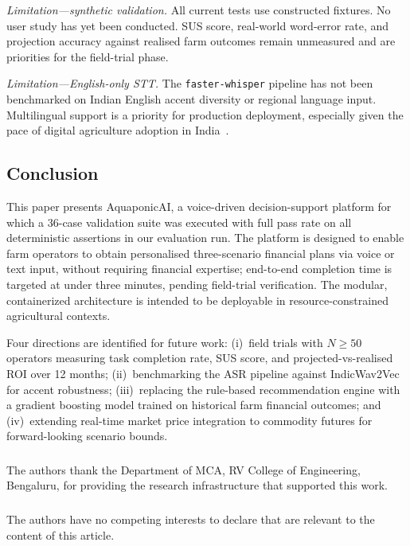 \documentclass[runningheads]{llncs}
\begin{document}
\noindent\textit{Limitation---synthetic validation.}
All current tests use constructed fixtures. No user study has yet been
conducted. SUS score, real-world word-error rate, and projection
accuracy against realised farm outcomes remain unmeasured and are
priorities for the field-trial phase.

\medskip
\noindent\textit{Limitation---English-only STT.}
The \texttt{faster-whisper} pipeline has not been benchmarked on
Indian English accent diversity or regional language input.
Multilingual support is a priority for production deployment,
especially given the pace of digital agriculture adoption in
India~\cite{ref18}.

\subsection{Conclusion}

This paper presents AquaponicAI, a voice-driven decision-support
platform for which a 36-case validation suite was executed with
full pass rate on all deterministic assertions in our evaluation run.
The platform is designed to enable farm operators to obtain
personalised three-scenario financial plans via voice or text input,
without requiring financial expertise; end-to-end completion time
is targeted at under three minutes, pending field-trial verification.
The modular, containerized architecture is intended to be deployable
in resource-constrained agricultural contexts.

Four directions are identified for future work:
(i)~field trials with $N{\geq}50$ operators measuring task completion
rate, SUS score, and projected-vs-realised ROI over 12 months;
(ii)~benchmarking the ASR pipeline against IndicWav2Vec for accent
robustness;
(iii)~replacing the rule-based recommendation engine with a gradient
boosting model trained on historical farm financial outcomes; and
(iv)~extending real-time market price integration to commodity futures
for forward-looking scenario bounds.

\begin{credits}
\subsubsection{\ackname}
The authors thank the Department of MCA, RV College of Engineering,
Bengaluru, for providing the research infrastructure that supported
this work.

\subsubsection{\discintname}
The authors have no competing interests to declare that are relevant
to the content of this article.
\end{credits}
\end{document}
